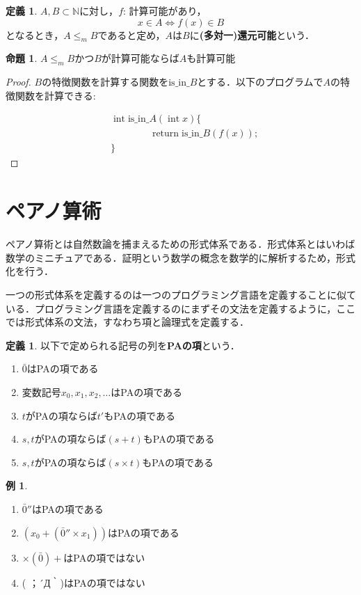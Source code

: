 \documentclass[uplatex]{jsarticle}
\newcommand{\N}{\mathbb{N}}
\theoremstyle{definition} %
\newtheorem{defi}[thm]{定義}
\newtheorem{prop}[thm]{命題}
\newtheorem{exm}[thm]{例}
\begin{document}
\begin{defi}
$A, B \subset \N$に対し，$f$: 計算可能があり，
\[x \in A \iff f(x) \in B\]
となるとき，$A \le_m B$であると定め，$A$は$B$に{\bfseries (多対一)還元可能}という．
\end{defi}

\begin{prop}\label{還元}
$A \le_m B$かつ$B$が計算可能ならば$A$も計算可能
\end{prop}
\begin{proof}
$B$の特徴関数を計算する関数を$\mathrm{is\_in\_}B$とする．以下のプログラムで$A$の特徴関数を計算できる:

\begin{align*}
&\operatorname{int} \mathrm{is\_in\_}A(\operatorname{int} x) \{ \\
&\hspace{4em}\operatorname{return} \mathrm{is\_in\_}B(f(x)); \\
&\}
\end{align*}
\end{proof}

\section{ペアノ算術}

ペアノ算術とは自然数論を捕まえるための形式体系である．形式体系とはいわば数学のミニチュアである．証明という数学の概念を数学的に解析するため，形式化を行う．

一つの形式体系を定義するのは一つのプログラミング言語を定義することに似ている．プログラミング言語を定義するのにまずその文法を定義するように，ここでは形式体系の文法，すなわち項と論理式を定義する．

\begin{defi}
以下で定められる記号の列を{\bfseries PAの項}という．
\begin{enumerate}
\item $\bar{0}$はPAの項である
\item 変数記号$x_0, x_1, x_2, \dots$はPAの項である
\item $t$がPAの項ならば$t'$もPAの項である
\item $s, t$がPAの項ならば$(s + t)$もPAの項である
\item $s, t$がPAの項ならば$(s \times t)$もPAの項である
\end{enumerate}
\end{defi}

\begin{exm}\leavevmode
\begin{enumerate}
\item $\bar{0}''$はPAの項である
\item $(x_0 + (\bar{0}'' \times x_1))$はPAの項である
\item $\times (\bar{0}) +$はPAの項ではない
\item ( ；´Д｀)はPAの項ではない
\end{enumerate}
\end{exm}
\end{document}
